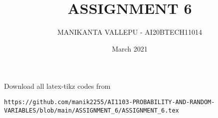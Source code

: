 \documentclass[journal,12pt,twocolumn]{IEEEtran}
\date{March 2021}
\DeclareMathOperator*{\Res}{Res}
\begin{document}
\newcommand{\BEQA}{\begin{eqnarray}}
\newcommand{\EEQA}{\end{eqnarray}}
\newcommand{\define}{\stackrel{\triangle}{=}}

\raggedbottom
\setlength{\parindent}{0pt}
\providecommand{\mbf}{\mathbf}
\providecommand{\pr}[1]{\ensuremath{\Pr\left(#1\right)}}
\providecommand{\qfunc}[1]{\ensuremath{Q\left(#1\right)}}
\providecommand{\fn}[1]{\ensuremath{f\left(#1\right)}}
\providecommand{\e}[1]{\ensuremath{E\left(#1\right)}}
\providecommand{\sbrak}[1]{\ensuremath{{}\left[#1\right]}}
\providecommand{\lsbrak}[1]{\ensuremath{{}\left[#1\right.}}
\providecommand{\rsbrak}[1]{\ensuremath{{}\left.#1\right]}}
\providecommand{\brak}[1]{\ensuremath{\left(#1\right)}}
\providecommand{\lbrak}[1]{\ensuremath{\left(#1\right.}}
\providecommand{\rbrak}[1]{\ensuremath{\left.#1\right)}}
\providecommand{\cbrak}[1]{\ensuremath{\left\{#1\right\}}}
\providecommand{\lcbrak}[1]{\ensuremath{\left\{#1\right.}}
\providecommand{\rcbrak}[1]{\ensuremath{\left.#1\right\}}}
\theoremstyle{remark}
\newtheorem{rem}{Remark}
\newcommand{\sgn}{\mathop{\mathrm{sgn}}}
\providecommand{\abs}[1]{\vert#1\vert}
\providecommand{\res}[1]{\Res\displaylimits_{#1}} 
\providecommand{\norm}[1]{\lVert#1\rVert}
\providecommand{\mtx}[1]{\mathbf{#1}}
\providecommand{\mean}[1]{E[ #1 ]}
\providecommand{\fourier}{\overset{\mathcal{F}}{ \rightleftharpoons}}
\providecommand{\system}{\overset{\mathcal{H}}{ \longleftrightarrow}}
\newcommand{\solution}{\noindent \textbf{Solution: }}
\newcommand{\cosec}{\,\text{cosec}\,}
\providecommand{\dec}[2]{\ensuremath{\overset{#1}{\underset{#2}{\gtrless}}}}
\newcommand{\myvec}[1]{\ensuremath{\begin{pmatrix}#1\end{pmatrix}}}
\newcommand{\mydet}[1]{\ensuremath{\begin{vmatrix}#1\end{vmatrix}}}
\makeatletter
\vspace{3cm}
\title{ASSIGNMENT 6}
\author{MANIKANTA VALLEPU - AI20BTECH11014}
\maketitle
\newpage
\bigskip
\renewcommand{\thetable}{\theenumi}
Download all latex-tikz codes from 
\begin{lstlisting}
https://github.com/manik2255/AI1103-PROBABILITY-AND-RANDOM-VARIABLES/blob/main/ASSIGNMENT_6/ASSIGNMENT_6.tex
\end{lstlisting}
\end{document}
